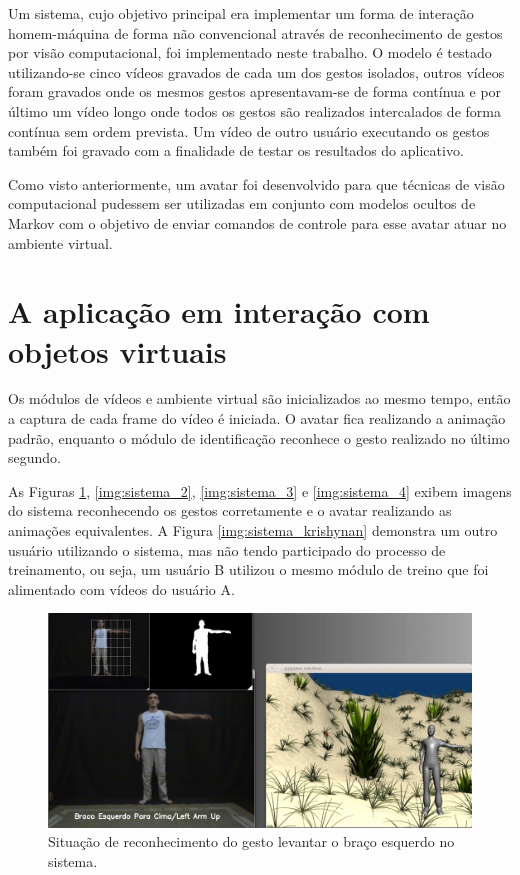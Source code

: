 
Um sistema, cujo objetivo principal era implementar um forma de interação homem-máquina de forma não convencional através de reconhecimento de gestos por visão computacional, foi implementado neste trabalho. O modelo é testado utilizando-se cinco vídeos gravados de cada um dos gestos isolados, outros vídeos foram gravados onde os mesmos gestos apresentavam-se de forma contínua e por último um vídeo longo onde todos os gestos são realizados intercalados de forma contínua sem ordem prevista. Um vídeo de outro usuário executando os gestos também foi gravado com a finalidade de testar os resultados do aplicativo.

Como visto anteriormente, um avatar foi desenvolvido para que técnicas de visão computacional pudessem ser utilizadas em conjunto com modelos ocultos de Markov com o objetivo de enviar comandos de controle para esse avatar atuar no ambiente virtual.


\section{A aplicação em interação com objetos virtuais}

Os módulos de vídeos e ambiente virtual são inicializados ao mesmo tempo, então a captura de cada frame do vídeo é iniciada. O avatar fica realizando a animação padrão, enquanto o módulo de identificação reconhece o gesto realizado no último segundo.

As Figuras \ref{img:sistema_1}, \ref{img:sistema_2}, \ref{img:sistema_3} e \ref{img:sistema_4} exibem imagens do sistema reconhecendo os gestos corretamente e o avatar realizando as animações equivalentes. A Figura \ref{img:sistema_krishynan} demonstra um outro usuário utilizando o sistema, mas não tendo participado do processo de treinamento, ou seja, um usuário B utilizou o mesmo módulo de treino que foi alimentado com vídeos do usuário A.

\begin{figure}[!htbp]
  \includegraphics[scale=0.35]{imagens/sistema_1.jpg}
  \caption{Situação de reconhecimento do gesto levantar o braço esquerdo no sistema.}
  \label{img:sistema_1}
\end{figure}

